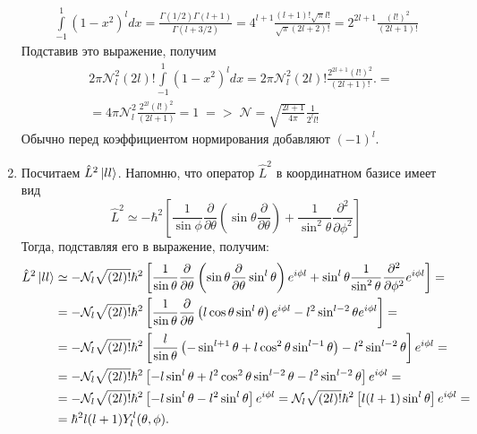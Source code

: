 \begin{enumerate}
    \begin{align*}
        \int\limits_{-1}^1 (1-x^2)^l dx = \frac{\Gamma(1/2)\Gamma(l+1)}{\Gamma(l+3/2)} = 4^{l+1}\frac{(l+1)!\sqrt{\pi}l!}{\sqrt{\pi}(2l+2)!} = 2^{2l + 1}\frac{(l!)^2}{(2l+1)!}
    \end{align*}
    Подставив это выражение, получим
    \begin{align*}
         & 2\pi\mathcal{N}^2_l(2l)!\int\limits_{-1}^1 (1-x^2)^l dx = 2\pi\mathcal{N}^2_l(2l)!\frac{2^{2l+1}(l!)^2}{(2l+1)!}. = \\
         & = 4\pi\mathcal{N}^2_l\frac{2^{2l}(l!)^2}{(2l+1)} = 1\; => \;\mathcal{N} = \sqrt{\frac{{2l+1}}{4\pi}}\frac{1}{2^ll!}
    \end{align*}
    Обычно перед коэффициентом нормирования добавляют $(-1)^{l}$.
    \item Посчитаем $\hat{L}^2\ket{ll}$. Напомню, что оператор $\hat{L}^2$ в координатном базисе имеет вид 
    \[
    \hat{L}^2 \simeq -\hbar^2\left[\frac{1}{\sin\phi}\frac{\partial}{\partial \theta}\left( \sin\theta\frac{\partial}{\partial \theta} \right) + \frac{1}{\sin^2\theta}\frac{\partial^2}{\partial\phi^2}\right]
    \]
    Тогда, подставляя его в выражение, получим:
    \begin{align*}
        \hat{L}^2\ket{ll} & \simeq  -\mathcal{N}_l\sqrt{(2l)!}\hbar^2\left[\frac{1}{\sin\theta}\frac{\partial}{\partial \theta}\left( \sin\theta\frac{\partial}{\partial \theta}\sin^l\theta \right)e^{i\phi l} + \sin^l\theta\frac{1}{\sin^2\theta}\frac{\partial^2}{\partial\phi^2} e^{i\phi l}\right] =\\
        & =  -\mathcal{N}_l\sqrt{(2l)!}\hbar^2\left[\frac{1}{\sin\theta}\frac{\partial}{\partial \theta}\left( l\cos\theta\sin^l\theta \right)e^{i\phi l} - l^2\sin^{l-2}\theta e^{i\phi l}\right] = \\
        & = -\mathcal{N}_l\sqrt{(2l)!}\hbar^2\left[\frac{l}{\sin\theta}\left(-\sin^{l+1}\theta + l\cos^2\theta\sin^{l-1}\theta\right) - l^2\sin^{l-2}\theta\right]e^{i\phi l} = \\
        & = -\mathcal{N}_l\sqrt{(2l)!}\hbar^2\left[-l\sin^{l}\theta + l^2\cos^2\theta\sin^{l-2}\theta - l^2\sin^{l-2}\theta\right]e^{i\phi l} = \\
        & = -\mathcal{N}_l\sqrt{(2l)!}\hbar^2\left[-l\sin^{l}\theta - l^2\sin^{l}\theta \right]e^{i\phi l} = \mathcal{N}_l\sqrt{(2l)!}\hbar^2\left[l(l + 1)\sin^l \theta \right]e^{i\phi l} = \\
        & = \hbar^2l(l+1)Y^l_l(\theta, \phi).
    \end{align*}

\end{enumerate}
